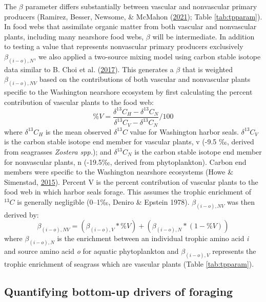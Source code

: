 \documentclass [11pt, proquest] {uwthesis}[2015/03/03]
\begin{document}
The \(\beta\) parameter differs substantially between vascular and
nonvascular primary producers (Ramirez, Besser, Newsome, \& McMahon
(\protect\hyperlink{ref-Ramirez2021}{2021}); Table \ref{tab:tpparam}).
In food webs that assimilate organic matter from both vascular and
nonvascular plants, including many nearshore food webs, \(\beta\) will
be intermediate. In addition to testing a value that represents
nonvascular primary producers exclusively \(\beta_{(i-o),N}\), we also
applied a two-source mixing model using carbon stable isotope data
similar to B. Choi et al. (\protect\hyperlink{ref-Choi2017}{2017}). This
generates a \(\beta\) that is weighted \(\beta_{(i-o),NV}\) based on the
contributions of both vascular and nonvascular plants specific to the
Washington nearshore ecosystem by first calculating the percent
contribution of vascular plants to the food web:
\begin{equation} 
  \% V =
    \frac{\delta^{13}C_{H} - \delta^{13}C_{N}}
    {\delta^{13}C_{V} - \delta^{13}C_{N}}/100
    \label{eq:perV}
\end{equation}
where \(\delta^{13}C_{H}\) is the mean observed \(\delta^{13}C\) value
for Washington harbor seals. \(\delta^{13}C_{V}\) is the carbon stable
isotope end member for vascular plants, v (-9.5 ‰, derived from
seagrasses \emph{Zostera spp.}); and \(\delta^{13}C_{N}\) is the carbon
stable isotope end member for nonvascular plants, n (-19.5‰, derived
from phytoplankton). Carbon end members were specific to the Washington
nearshore ecosystems (Howe \& Simenstad,
\protect\hyperlink{ref-Howe2015}{2015}). Percent V is the percent
contribution of vascular plants to the food web in which harbor seals
forage. This assumes the trophic enrichment of \(^{13}C\) is generally
negligible (0--1‰, Deniro \& Epstein 1978). \(\beta_{(i-o),NV}\) was
then derived by:
\begin{equation} 
\beta_{(i-o),NV} = (\beta_{(i-o),V}*\%V) +
(\beta_{(i-o),N}*(1-\%V))
  \label{eq:betanv}
\end{equation}
where \(\beta_{(i-o),N}\) is the enrichment between an individual
trophic amino acid \emph{i} and source amino acid \emph{o} for aquatic
phytoplankton and \(\beta_{(i-o),V}\) represents the trophic enrichment
of seagrass which are vascular plants (Table \ref{tab:tpparam}).

\subsection{Quantifying bottom-up drivers of
foraging}\label{quantifying-bottom-up-drivers-of-foraging}
\end{document}
